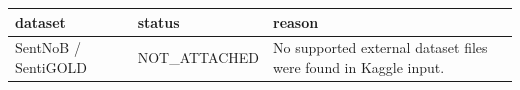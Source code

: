 \begin{tabular}{lll}
\toprule
dataset & status & reason \\
\midrule
SentNoB / SentiGOLD & NOT\_ATTACHED & No supported external dataset files were found in Kaggle input. \\
\bottomrule
\end{tabular}
